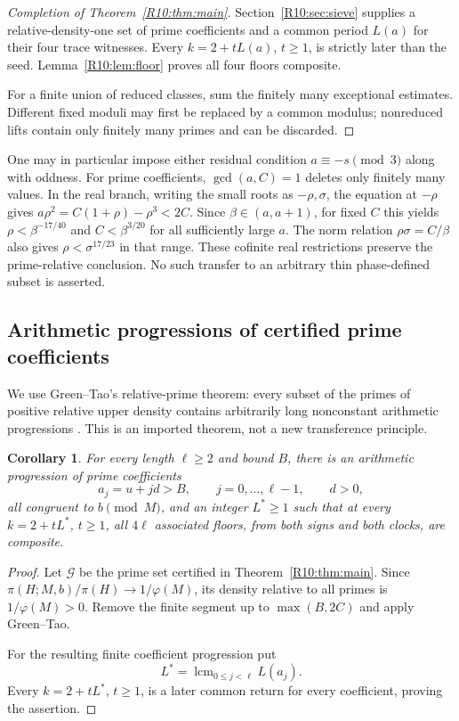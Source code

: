 \documentclass[11pt,a4paper]{article}
\newtheorem{corollary}[theorem]{Corollary}\newtheorem{mainthm}[theorem]{Theorem}
\theoremstyle{definition}\newtheorem{definition}[theorem]{Definition}
\theoremstyle{remark}\newtheorem{remark}[theorem]{Remark}
\DeclareMathOperator{\lcm}{lcm}\DeclareMathOperator{\disc}{disc}\DeclareMathOperator{\Res}{Res}
\begin{document}
\begin{proof}[Completion of Theorem~\ref{R10:thm:main}]
Section~\ref{R10:sec:sieve} supplies a relative-density-one set of prime
coefficients and a common period $L(a)$ for their four trace witnesses.
Every $k=2+tL(a)$, $t\ge1$, is strictly later than the seed.
Lemma~\ref{R10:lem:floor} proves all four floors composite.

For a finite union of reduced classes, sum the finitely many exceptional
estimates. Different fixed moduli may first be replaced by a common
modulus; nonreduced lifts contain only finitely many primes and can be discarded.
\end{proof}

One may in particular impose either residual condition $a\equiv-s\pmod3$
along with oddness. For prime coefficients, $\gcd(a,C)=1$ deletes only
finitely many values.
In the real branch, writing the small roots as $-\rho,\sigma$, the
equation at $-\rho$ gives
$a\rho^2=C(1+\rho)-\rho^3<2C$.
Since $\beta\in(a,a+1)$, for fixed $C$ this yields
$\rho<\beta^{-17/40}$ and $C<\beta^{3/20}$ for all sufficiently large
$a$. The norm relation $\rho\sigma=C/\beta$ also gives
$\rho<\sigma^{17/23}$ in that range.
These cofinite real restrictions preserve the prime-relative conclusion.
No such transfer to an arbitrary thin phase-defined subset is asserted.

\subsection{Arithmetic progressions of certified prime coefficients}

We use Green--Tao's relative-prime theorem: every subset of the primes
of positive relative upper density contains arbitrarily long nonconstant
arithmetic progressions \cite[Theorem~1.2]{GreenTao}.
This is an imported theorem, not a new transference principle.

\begin{corollary}\label{R10:cor:GT}
For every length $\ell\ge2$ and bound $B$, there is an arithmetic
progression of prime coefficients
\[
             a_j=u+jd>B,\qquad j=0,\ldots,\ell-1,\qquad d>0,
\]
all congruent to $b\pmod M$, and an integer $L^*\ge1$ such that
at every $k=2+tL^*$, $t\ge1$, all $4\ell$ associated floors,
from both signs and both clocks, are composite.
\end{corollary}
\begin{proof}
Let $\mathcal G$ be the prime set certified in Theorem~\ref{R10:thm:main}.
Since $\pi(H;M,b)/\pi(H)\to1/\varphi(M)$, its density relative to all
primes is $1/\varphi(M)>0$.
Remove the finite segment up to $\max(B,2C)$ and apply Green--Tao.

For the resulting finite coefficient progression put
\[
                              L^*=\lcm_{0\le j<\ell}L(a_j).
\]
Every $k=2+tL^*$, $t\ge1$, is a later common return for every coefficient,
proving the assertion.
\end{proof}
\end{document}
